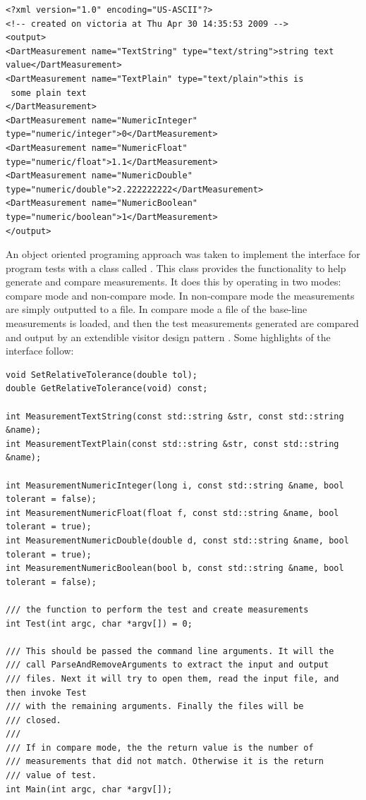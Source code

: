 \documentclass{InsightArticle}
\begin{document}
\small
\begin{verbatim}
<?xml version="1.0" encoding="US-ASCII"?>
<!-- created on victoria at Thu Apr 30 14:35:53 2009 -->
<output>
<DartMeasurement name="TextString" type="text/string">string text value</DartMeasurement>
<DartMeasurement name="TextPlain" type="text/plain">this is
 some plain text
</DartMeasurement>
<DartMeasurement name="NumericInteger" type="numeric/integer">0</DartMeasurement>
<DartMeasurement name="NumericFloat" type="numeric/float">1.1</DartMeasurement>
<DartMeasurement name="NumericDouble" type="numeric/double">2.222222222</DartMeasurement>
<DartMeasurement name="NumericBoolean" type="numeric/boolean">1</DartMeasurement>
</output>
\end{verbatim}


An object oriented programing approach was taken to implement the interface for program tests with a class called .  This class provides the functionality to help generate and compare measurements. It does this by operating in two modes: compare mode and non-compare mode. In non-compare mode the measurements are simply outputted to a file. In compare mode a file of the base-line measurements is loaded, and then the test measurements generated are compared and output by an extendible visitor design pattern \cite{Gamma1995}. Some highlights of the  interface follow:

\small
\begin{verbatim}
void SetRelativeTolerance(double tol);
double GetRelativeTolerance(void) const;

int MeasurementTextString(const std::string &str, const std::string &name);
int MeasurementTextPlain(const std::string &str, const std::string &name);

int MeasurementNumericInteger(long i, const std::string &name, bool tolerant = false);
int MeasurementNumericFloat(float f, const std::string &name, bool tolerant = true);
int MeasurementNumericDouble(double d, const std::string &name, bool tolerant = true);
int MeasurementNumericBoolean(bool b, const std::string &name, bool tolerant = false);

/// the function to perform the test and create measurements
int Test(int argc, char *argv[]) = 0;

/// This should be passed the command line arguments. It will the
/// call ParseAndRemoveArguments to extract the input and output
/// files. Next it will try to open them, read the input file, and then invoke Test
/// with the remaining arguments. Finally the files will be
/// closed.
///
/// If in compare mode, the the return value is the number of
/// measurements that did not match. Otherwise it is the return
/// value of test.
int Main(int argc, char *argv[]);
\end{verbatim}
\end{document}
